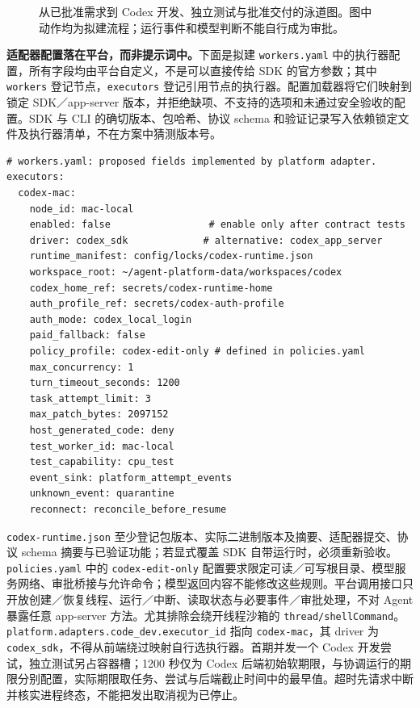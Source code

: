 \documentclass[11pt,a4paper]{article}
\begin{document}
\begin{figure}[H]
\caption{从已批准需求到 Codex 开发、独立测试与批准交付的泳道图。图中动作均为拟建流程；运行事件和模型判断不能自行成为审批。}
\label{fig:codex-development-swimlane}
\end{figure}

\textbf{适配器配置落在平台，而非提示词中。}下面是拟建 \texttt{workers.yaml} 中的执行器配置，所有字段均由平台自定义，不是可以直接传给 SDK 的官方参数；其中 \texttt{workers} 登记节点，\texttt{executors} 登记引用节点的执行器。配置加载器将它们映射到锁定 SDK／app-server 版本，并拒绝缺项、不支持的选项和未通过安全验收的配置。SDK 与 CLI 的确切版本、包哈希、协议 schema 和验证记录写入依赖锁定文件及执行器清单，不在方案中猜测版本号。

\par\noindent\begin{minipage}{\linewidth}
\begin{lstlisting}
# workers.yaml: proposed fields implemented by platform adapter.
executors:
  codex-mac:
    node_id: mac-local
    enabled: false                 # enable only after contract tests
    driver: codex_sdk             # alternative: codex_app_server
    runtime_manifest: config/locks/codex-runtime.json
    workspace_root: ~/agent-platform-data/workspaces/codex
    codex_home_ref: secrets/codex-runtime-home
    auth_profile_ref: secrets/codex-auth-profile
    auth_mode: codex_local_login
    paid_fallback: false
    policy_profile: codex-edit-only # defined in policies.yaml
    max_concurrency: 1
    turn_timeout_seconds: 1200
    task_attempt_limit: 3
    max_patch_bytes: 2097152
    host_generated_code: deny
    test_worker_id: mac-local
    test_capability: cpu_test
    event_sink: platform_attempt_events
    unknown_event: quarantine
    reconnect: reconcile_before_resume
\end{lstlisting}
\end{minipage}\par

\texttt{codex-runtime.json} 至少登记包版本、实际二进制版本及摘要、适配器提交、协议 schema 摘要与已验证功能；若显式覆盖 SDK 自带运行时，必须重新验收。\texttt{policies.yaml} 中的 \texttt{codex-edit-only} 配置要求限定可读／可写根目录、模型服务网络、审批桥接与允许命令；模型返回内容不能修改这些规则。平台调用接口只开放创建／恢复线程、运行／中断、读取状态与必要事件／审批处理，不对 Agent 暴露任意 app-server 方法。尤其排除会绕开线程沙箱的 \texttt{thread/shellCommand}。\cite{codex-app} \texttt{platform.adapters.code\_dev.executor\_id} 指向 \texttt{codex-mac}，其 driver 为 \texttt{codex\_sdk}，不得从前端绕过映射自行选执行器。首期并发一个 Codex 开发尝试，独立测试另占容器槽；1200 秒仅为 Codex 后端初始软期限，与协调运行的期限分别配置，实际期限取任务、尝试与后端截止时间中的最早值。超时先请求中断并核实进程终态，不能把发出取消视为已停止。
\end{document}
